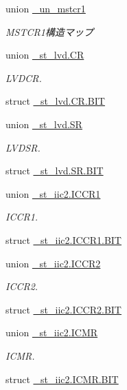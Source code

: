 \begin{DoxyCompactItemize}
union \hyperlink{3694s_8h_d5/de9/union__un__mstcr1}{\+\_\+un\+\_\+mstcr1}
\begin{DoxyCompactList}\small\item\em M\+S\+T\+C\+R1構造マップ \end{DoxyCompactList}\item 
union \hyperlink{3694s_8h_de/d14/union__st__lvd_8CR}{\+\_\+st\+\_\+lvd.\+C\+R}
\begin{DoxyCompactList}\small\item\em L\+V\+D\+C\+R. \end{DoxyCompactList}\item 
struct \hyperlink{3694s_8h_d0/dc2/struct__st__lvd_8CR_8BIT}{\+\_\+st\+\_\+lvd.\+C\+R.\+B\+I\+T}
\item 
union \hyperlink{3694s_8h_d3/d55/union__st__lvd_8SR}{\+\_\+st\+\_\+lvd.\+S\+R}
\begin{DoxyCompactList}\small\item\em L\+V\+D\+S\+R. \end{DoxyCompactList}\item 
struct \hyperlink{3694s_8h_db/d62/struct__st__lvd_8SR_8BIT}{\+\_\+st\+\_\+lvd.\+S\+R.\+B\+I\+T}
\item 
union \hyperlink{3694s_8h_d7/d45/union__st__iic2_8ICCR1}{\+\_\+st\+\_\+iic2.\+I\+C\+C\+R1}
\begin{DoxyCompactList}\small\item\em I\+C\+C\+R1. \end{DoxyCompactList}\item 
struct \hyperlink{3694s_8h_d8/dba/struct__st__iic2_8ICCR1_8BIT}{\+\_\+st\+\_\+iic2.\+I\+C\+C\+R1.\+B\+I\+T}
\item 
union \hyperlink{3694s_8h_d1/d93/union__st__iic2_8ICCR2}{\+\_\+st\+\_\+iic2.\+I\+C\+C\+R2}
\begin{DoxyCompactList}\small\item\em I\+C\+C\+R2. \end{DoxyCompactList}\item 
struct \hyperlink{3694s_8h_d9/da3/struct__st__iic2_8ICCR2_8BIT}{\+\_\+st\+\_\+iic2.\+I\+C\+C\+R2.\+B\+I\+T}
\item 
union \hyperlink{3694s_8h_d4/d53/union__st__iic2_8ICMR}{\+\_\+st\+\_\+iic2.\+I\+C\+M\+R}
\begin{DoxyCompactList}\small\item\em I\+C\+M\+R. \end{DoxyCompactList}\item 
struct \hyperlink{3694s_8h_d0/dbe/struct__st__iic2_8ICMR_8BIT}{\+\_\+st\+\_\+iic2.\+I\+C\+M\+R.\+B\+I\+T}

\end{DoxyCompactItemize}
